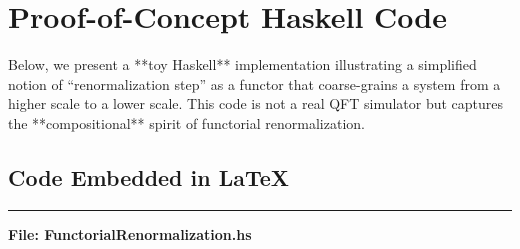 \documentclass[12pt]{article}
\begin{document}
\section{Proof-of-Concept Haskell Code}
\label{sec:haskellCode}

Below, we present a **toy Haskell** implementation illustrating a simplified notion of “renormalization step” as a functor 
that coarse-grains a system from a higher scale to a lower scale. This code is not a real QFT simulator 
but captures the **compositional** spirit of functorial renormalization.

\subsection{Code Embedded in \LaTeX}

\noindent\rule{\textwidth}{0.4pt}
\textbf{File: FunctorialRenormalization.hs}
\end{document}

